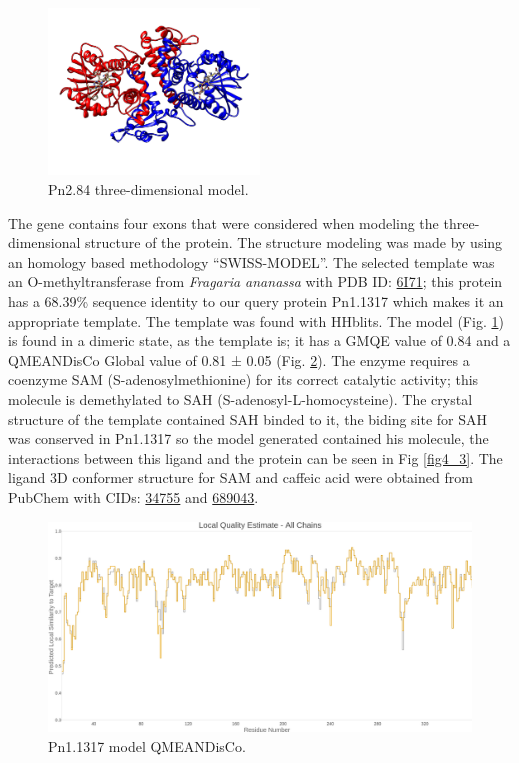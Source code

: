 \documentclass[12pt]{article}
\begin{document}
	
	\FloatBarrier
	\begin{figure}
		\centering
		\includegraphics[width=0.5\textwidth]{../4/Swiss/model2.png}
		\caption{\centering Pn2.84 three-dimensional model.}
		\label{fig4_1}
	\end{figure}
	\FloatBarrier
	
	The gene contains four exons that were considered when modeling the three-dimensional structure of the protein. The structure modeling was made by using an homology based methodology ``SWISS-MODEL''. \cite{swiss} The selected template was an O-methyltransferase from \textit{Fragaria ananassa} with PDB ID: \href{https://www.rcsb.org/structure/6I71}{6I71}; this protein has a 68.39\% sequence identity to our query protein Pn1.1317 which makes it an appropriate template. The template was found with HHblits. \cite{hhblits} The model (Fig. \ref{fig4_1}) is found in a dimeric state, as the template is; it has a GMQE value of 0.84 and a QMEANDisCo Global value of 0.81 ± 0.05 (Fig. \ref{fig4_2}). \cite{qmeandisco_swiss}	The enzyme requires a coenzyme SAM (S-adenosylmethionine) for its correct catalytic activity; this molecule is demethylated to SAH (S-adenosyl-L-homocysteine). The crystal structure of the template contained SAH binded to it, the biding site for SAH was conserved in Pn1.1317 so the model generated contained his molecule, the interactions between this ligand and the protein can be seen in Fig \ref{fig4_3}. The ligand 3D conformer structure for SAM and caffeic acid were obtained from PubChem with CIDs: \href{https://pubchem.ncbi.nlm.nih.gov/compound/34755}{34755} and \href{https://pubchem.ncbi.nlm.nih.gov/compound/689043}{689043}.
	
	\FloatBarrier
	\begin{figure}[h!]
		\centering
		\includegraphics[width=\textwidth-50pt]{../4/Swiss/Local_quality_estimate.png}
		\caption{\centering Pn1.1317 model QMEANDisCo.}
		\label{fig4_2}
	\end{figure}
	\FloatBarrier
	
\end{document}
